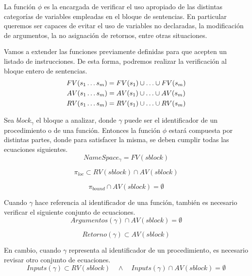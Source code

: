 \documentclass{article}
\begin{document}
La función $\phi$ es la encargada de verificar el uso apropiado de las distintas categorías de variables empleadas en el bloque de sentencias.
En particular queremos ser capaces de evitar el uso de variables no declaradas, la modificación de argumentos, la no asignación de retornos, entre otras situaciones.

Vamos a extender las funciones previamente definidas para que acepten un listado de instrucciones.
De esta forma, podremos realizar la verificación al bloque entero de sentencias.
\begin{gather*}
FV(s_1 \ldots s_m) = FV(s_1) \cup \ldots \cup FV(s_m)
\\
AV(s_1 \ldots s_m) = AV(s_1) \cup \ldots \cup AV(s_m)
\\
RV(s_1 \ldots s_m) = RV(s_1) \cup \ldots \cup RV(s_m)
\end{gather*}

Sea $block_\gamma$ el bloque a analizar, donde $\gamma$ puede ser el identificador de un procedimiento o de una función.
Entonces la función $\phi$ estará compuesta por distintas partes, donde para satisfacer la misma, se deben cumplir todas las ecuaciones siguientes.
\begin{equation*}
NameSpace_{\gamma} = FV(sblock)
\end{equation*}

\begin{equation*}
\pi_{loc} \subset RV(sblock) \cap AV(sblock)
\end{equation*}

\begin{equation*}
\pi_{bound} \cap AV(sblock) = \emptyset
\end{equation*}

Cuando $\gamma$ hace referencia al identificador de una función, también es necesario verificar el siguiente conjunto de ecuaciones.
\begin{equation*}
Argumentos(\gamma) \cap AV(sblock) = \emptyset
\end{equation*}

\begin{equation*}
Retorno(\gamma) \subset AV(sblock)
\end{equation*}

En cambio, cuando $\gamma$ representa al identificador de un procedimiento, es necesario revisar otro conjunto de ecuaciones.
\begin{equation*}
Inputs(\gamma) \subset RV(sblock)
\quad \wedge \quad
Inputs(\gamma) \cap AV(sblock) = \emptyset
\end{equation*}
\end{document}
